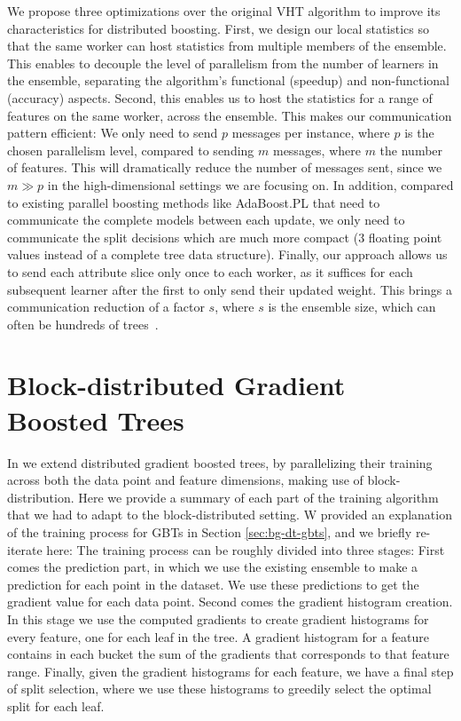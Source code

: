 We propose three optimizations over the original VHT algorithm to improve its
characteristics for distributed boosting. First, we design our local statistics
so that the same worker can host statistics from multiple members of the ensemble.
This enables to decouple the level of parallelism from the number of learners
in the ensemble, separating the algorithm's functional (speedup) and non-functional
(accuracy) aspects.
Second, this enables us to host the statistics for a range of features on the same
worker, across the ensemble. This makes our communication pattern efficient:
We only need to send $p$  messages per instance, where $p$ is the chosen
parallelism level, compared to sending $m$ messages, where $m$ the
number of features. This will dramatically
reduce the number of messages sent, since we $m \gg p$ in the high-dimensional
settings we are focusing on. In addition, compared to existing
parallel boosting methods like AdaBoost.PL \cite{adaboost-pl} that need to communicate the complete
models between each update, we only need to communicate the split decisions which are
much more compact (3 floating point values instead of a complete tree data structure).
Finally, our approach allows us to send each attribute slice only once to
each worker, as it suffices for each subsequent learner after the first
to only send their updated weight. This brings a communication reduction
of a factor $s$, where $s$ is the ensemble size, which can often be hundreds of
trees~\cite{hundreds-classifiers}.

\section{Block-distributed Gradient Boosted Trees}
\label{sec:block-gbt}

In \blockgbt we extend distributed gradient boosted trees, by parallelizing their
training across both the data point and feature dimensions, making use of block-distribution.
Here we provide a summary of each part of the training algorithm that we had to
adapt to the block-distributed setting. W provided an explanation of the training
process for GBTs in Section \ref{sec:bg-dt-gbts}, and we briefly re-iterate here:
The training process can be roughly divided into three stages: First comes
the prediction part, in which we use the existing ensemble to make a prediction
for each point in the dataset. We use these predictions to get the gradient
value for each data point. Second comes the gradient histogram creation.
In this stage we use the computed gradients to create gradient histograms
for every feature, one for each leaf in the tree. A gradient histogram
for a feature contains in each bucket the sum of the gradients that corresponds to
that feature range. Finally, given the gradient histograms for each feature,
we have a final step of split selection, where we use these histograms to greedily
select the optimal split for each leaf.

